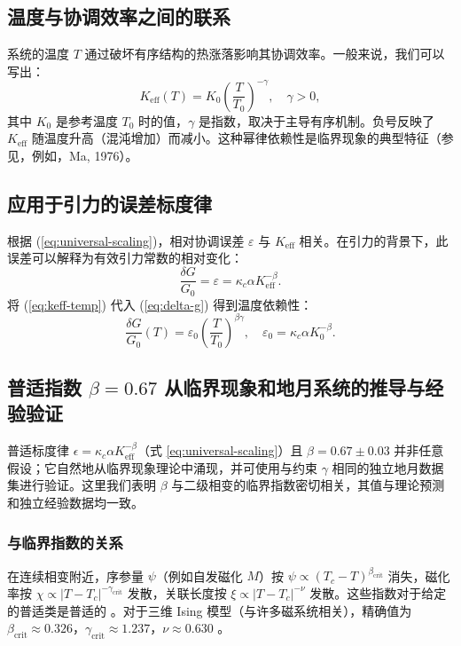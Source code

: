 \documentclass[12pt]{article}
\theoremstyle{remark}
\newcommand{\Keff}{K_{\mathrm{eff}}}
\newcommand{\eps}{\varepsilon}
\newcommand{\kappac}{\kappa_c}
\begin{document}
	\subsection{温度与协调效率之间的联系}
	\label{subsec:temp-keff}
	
	系统的温度 $T$ 通过破坏有序结构的热涨落影响其协调效率。一般来说，我们可以写出：
	\begin{equation}
		\Keff(T) = K_0 \left( \frac{T}{T_0} \right)^{-\gamma}, \quad \gamma > 0,
		\label{eq:keff-temp}
	\end{equation}
	其中 $K_0$ 是参考温度 $T_0$ 时的值，$\gamma$ 是指数，取决于主导有序机制。负号反映了 $\Keff$ 随温度升高（混沌增加）而减小。这种幂律依赖性是临界现象的典型特征（参见，例如，Ma, 1976）。
	
	\subsection{应用于引力的误差标度律}
	\label{subsec:error-gravity}
	
	根据 (\ref{eq:universal-scaling})，相对协调误差 $\eps$ 与 $\Keff$ 相关。在引力的背景下，此误差可以解释为有效引力常数的相对变化：
	\begin{equation}
		\frac{\delta G}{G_0} = \eps = \kappac \alpha \Keff^{-\beta}.
		\label{eq:delta-g}
	\end{equation}
	将 (\ref{eq:keff-temp}) 代入 (\ref{eq:delta-g}) 得到温度依赖性：
	\begin{equation}
		\frac{\delta G}{G_0}(T) = \eps_0 \left( \frac{T}{T_0} \right)^{\beta\gamma}, \quad \eps_0 = \kappac \alpha K_0^{-\beta}.
		\label{eq:g-temp}
	\end{equation}
	
	\subsection{普适指数 \(\beta = 0.67\) 从临界现象和地月系统的推导与经验验证}
	\label{subsec:beta-empirical}
	
	普适标度律 $\epsilon = \kappa_c \alpha K_{\mathrm{eff}}^{-\beta}$（式 \ref{eq:universal-scaling}）且 $\beta = 0.67 \pm 0.03$ 并非任意假设；它自然地从临界现象理论中涌现，并可使用与约束 $\gamma$ 相同的独立地月数据集进行验证。这里我们表明 $\beta$ 与二级相变的临界指数密切相关，其值与理论预测和独立经验数据均一致。
	
	\subsubsection{与临界指数的关系}
	在连续相变附近，序参量 $\psi$（例如自发磁化 $M$）按 $\psi \propto (T_c - T)^{\beta_{\mathrm{crit}}}$ 消失，磁化率按 $\chi \propto |T - T_c|^{-\gamma_{\mathrm{crit}}}$ 发散，关联长度按 $\xi \propto |T - T_c|^{-\nu}$ 发散。这些指数对于给定的普适类是普适的 \cite{Wilson1974, Fisher1974}。对于三维 Ising 模型（与许多磁系统相关），精确值为 $\beta_{\mathrm{crit}} \approx 0.326$，$\gamma_{\mathrm{crit}} \approx 1.237$，$\nu \approx 0.630$ \cite{El-Showk2014}。
	
\end{document}
